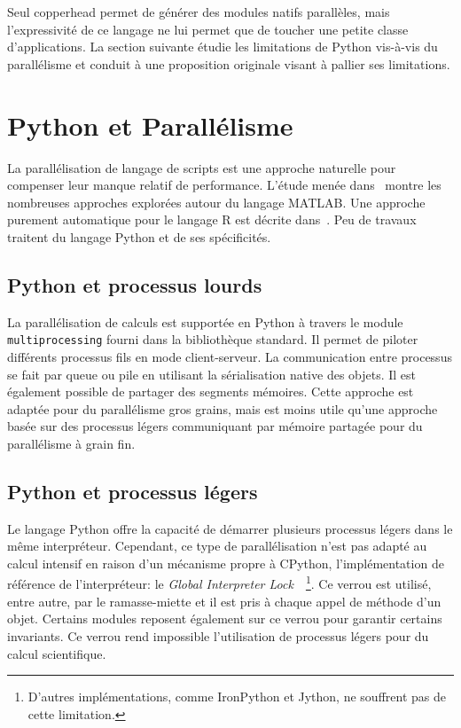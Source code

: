 \documentclass[renpar]{compas2013}
\begin{document}
Seul copperhead permet de générer des modules natifs parallèles, mais
l'expressivité de ce langage ne lui permet que de toucher une petite
classe d'applications. La section suivante étudie les limitations de
Python vis-à-vis du parallélisme et conduit à une proposition originale
visant à pallier ses limitations.

\section{Python et Parallélisme}\label{sec:python-parallelism}

La parallélisation de langage de scripts est une approche naturelle pour
compenser leur manque relatif de performance. L'étude menée
dans~\cite{choy05} montre les nombreuses approches explorées autour du
langage MATLAB. Une approche purement automatique pour le langage R est
décrite dans~\cite{mals07}. Peu de travaux traitent du langage Python et
de ses spécificités.

\subsection{Python et processus lourds}

La parallélisation de calculs est supportée en Python à travers le module
\texttt{multiprocessing} fourni dans la bibliothèque standard.  Il permet
de piloter différents processus fils en mode client-serveur. La
communication entre processus se fait par queue ou pile en utilisant la
sérialisation native des objets. Il est également possible de partager des
segments mémoires. Cette approche est adaptée pour du parallélisme gros
grains, mais est moins utile qu'une approche basée sur des processus
légers communiquant par mémoire partagée pour du parallélisme à grain fin.

\subsection{Python et processus légers}

Le langage Python offre la capacité de démarrer plusieurs processus légers
dans le même interpréteur. Cependant, ce type de parallélisation n'est pas
adapté au calcul intensif en raison d'un mécanisme propre à CPython,
l'implémentation de référence de l'interpréteur: le \emph{Global
Interpreter Lock}~\cite{gil2012}~\footnote{D'autres implémentations, comme
IronPython et Jython, ne souffrent pas de cette limitation.}. Ce verrou
est utilisé, entre autre, par le ramasse-miette et il est pris à chaque
appel de méthode d'un objet.  Certains modules reposent également sur ce
verrou pour garantir certains invariants. Ce verrou rend impossible
l'utilisation de processus légers pour du calcul scientifique.
\end{document}
